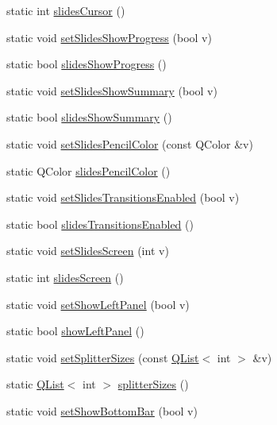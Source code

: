 \begin{DoxyCompactItemize}
static int \hyperlink{classOkular_1_1Settings_aac00b87a49bebb7adef0c2ea07a9f45a}{slides\+Cursor} ()
\item 
static void \hyperlink{classOkular_1_1Settings_a5744621e1edf0237ebcbdc2f0fd3d441}{set\+Slides\+Show\+Progress} (bool v)
\item 
static bool \hyperlink{classOkular_1_1Settings_adaff54c9d51048ae83c20cda246ff422}{slides\+Show\+Progress} ()
\item 
static void \hyperlink{classOkular_1_1Settings_a24bd89c2c6951695e5640daee191b1b3}{set\+Slides\+Show\+Summary} (bool v)
\item 
static bool \hyperlink{classOkular_1_1Settings_af1bed3edd5923092959ba3dc5afde059}{slides\+Show\+Summary} ()
\item 
static void \hyperlink{classOkular_1_1Settings_adc6a515a923e4805357d52795b59e2a2}{set\+Slides\+Pencil\+Color} (const Q\+Color \&v)
\item 
static Q\+Color \hyperlink{classOkular_1_1Settings_a889828534ec971eb3c641d7fcbcff53c}{slides\+Pencil\+Color} ()
\item 
static void \hyperlink{classOkular_1_1Settings_ad44552706de372cb69ae19c9187a0740}{set\+Slides\+Transitions\+Enabled} (bool v)
\item 
static bool \hyperlink{classOkular_1_1Settings_a162854bc5158392502c2e74ef305d011}{slides\+Transitions\+Enabled} ()
\item 
static void \hyperlink{classOkular_1_1Settings_aed059e5c99bf4b2569dc7f30067bbec8}{set\+Slides\+Screen} (int v)
\item 
static int \hyperlink{classOkular_1_1Settings_a581f13df17ff6819ac4ffb0ef3b672b0}{slides\+Screen} ()
\item 
static void \hyperlink{classOkular_1_1Settings_a42bd52d91b746a6b4285ec021b5b58e1}{set\+Show\+Left\+Panel} (bool v)
\item 
static bool \hyperlink{classOkular_1_1Settings_a3d972a6caf8dc1ba7dd30990d18e83ca}{show\+Left\+Panel} ()
\item 
static void \hyperlink{classOkular_1_1Settings_a8130c765d358a500e2b829803ed7c015}{set\+Splitter\+Sizes} (const \hyperlink{classQList}{Q\+List}$<$ int $>$ \&v)
\item 
static \hyperlink{classQList}{Q\+List}$<$ int $>$ \hyperlink{classOkular_1_1Settings_a5215a8ae32e5b7712656465257c0814e}{splitter\+Sizes} ()
\item 
static void \hyperlink{classOkular_1_1Settings_af1b587b73313232e3a01f0452b8ccc52}{set\+Show\+Bottom\+Bar} (bool v)
\item 

\end{DoxyCompactItemize}
